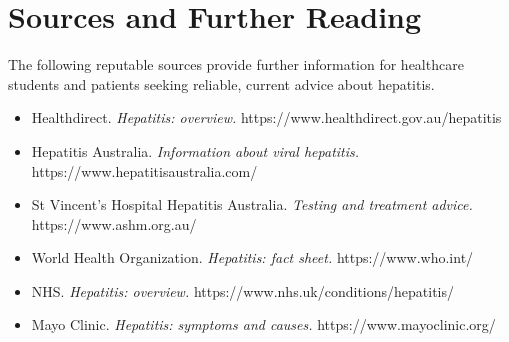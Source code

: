 \section*{Sources and Further Reading}
The following reputable sources provide further information for healthcare students and patients seeking reliable, current advice about hepatitis.

\begin{itemize}
    \item Healthdirect. \textit{Hepatitis: overview.} https://www.healthdirect.gov.au/hepatitis
    \item Hepatitis Australia. \textit{Information about viral hepatitis.} https://www.hepatitisaustralia.com/
    \item St Vincent's Hospital Hepatitis Australia. \textit{Testing and treatment advice.} https://www.ashm.org.au/
    \item World Health Organization. \textit{Hepatitis: fact sheet.} https://www.who.int/
    \item NHS. \textit{Hepatitis: overview.} https://www.nhs.uk/conditions/hepatitis/
    \item Mayo Clinic. \textit{Hepatitis: symptoms and causes.} https://www.mayoclinic.org/
\end{itemize}
